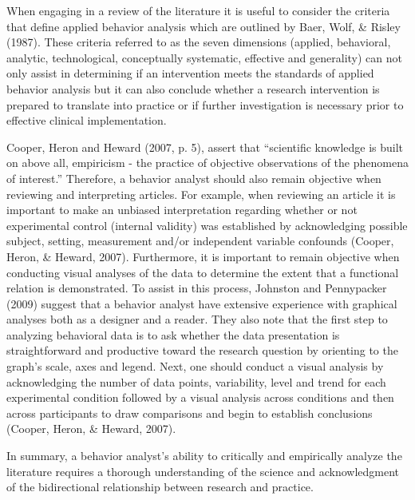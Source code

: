 When engaging in a review of the literature it is useful to consider the criteria that define applied behavior analysis which are outlined by Baer, Wolf, \& Risley (1987). These criteria referred to as the seven dimensions (applied, behavioral, analytic, technological, conceptually systematic, effective and generality) can not only assist in determining if an intervention  meets the standards of applied behavior analysis but it can also conclude whether a research intervention is prepared to translate into  practice or if further investigation is necessary prior to  effective clinical implementation.

Cooper, Heron and Heward (2007, p. 5), assert that ``scientific knowledge is built on above all, empiricism - the practice of objective observations of the phenomena of interest.'' Therefore, a behavior analyst should also remain objective when reviewing and interpreting articles.  For example, when reviewing an article it is important to make an unbiased interpretation regarding whether or not experimental control (internal validity) was established by acknowledging possible subject, setting, measurement and/or independent variable confounds (Cooper, Heron, \& Heward, 2007). Furthermore, it is important to remain objective when conducting visual analyses of the data to determine the extent that a functional relation is demonstrated. To assist in this process, Johnston and Pennypacker (2009) suggest that a behavior analyst have extensive experience with graphical analyses both as a designer and a reader.  They also note that the first step to analyzing behavioral data is to ask whether the data presentation is straightforward and productive toward the research question by orienting to the graph's scale, axes and legend.  Next, one should conduct a visual analysis by acknowledging the number of data points, variability, level and trend for each experimental condition followed by a visual analysis across conditions  and then across participants to draw comparisons and begin to establish conclusions (Cooper, Heron, \& Heward, 2007).

     In summary, a behavior analyst's ability to critically and empirically analyze the literature requires a thorough understanding of the science and acknowledgment of the bidirectional relationship between research and practice. 
%
